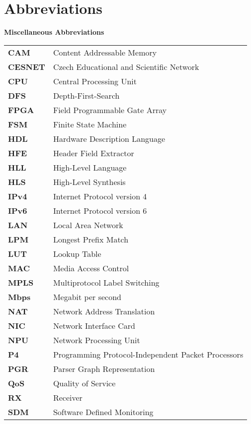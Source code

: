 \chapter{Abbreviations}

\noindent\textbf{Miscellaneous Abbreviations}\\

\begin{longtable}[l]{ll}
\textbf{CAM}     & Content Addressable Memory \\
\textbf{CESNET}  & Czech Educational and Scientific Network \\
\textbf{CPU}     & Central Processing Unit\\
\textbf{DFS}     & Depth-First-Search\\
\textbf{FPGA}    & Field Programmable Gate Array \\
\textbf{FSM}     & Finite State Machine \\
\textbf{HDL}     & Hardware Description Language\\ 
\textbf{HFE}     & Header Field Extractor \\
\textbf{HLL}     & High-Level Language \\
\textbf{HLS}     & High-Level Synthesis \\
\textbf{IPv4}    & Internet Protocol version 4\\
\textbf{IPv6}    & Internet Protocol version 6\\
\textbf{LAN}     & Local Area Network \\
\textbf{LPM}     & Longest Prefix Match \\
\textbf{LUT}     & Lookup Table \\
\textbf{MAC}     & Media Access Control \\
\textbf{MPLS}    & Multiprotocol Label Switching \\
\textbf{Mbps}    & Megabit per second \\
\textbf{NAT}     & Network Address Translation \\
\textbf{NIC}     & Network Interface Card \\
\textbf{NPU}     & Network Processing Unit \\
\textbf{P4}      & Programming Protocol-Independent Packet Processors \\
\textbf{PGR}     & Parser Graph Representation \\
\textbf{QoS}     & Quality of Service \\
\textbf{RX}      & Receiver \\
\textbf{SDM}     & Software Defined Monitoring \\

\end{longtable}
